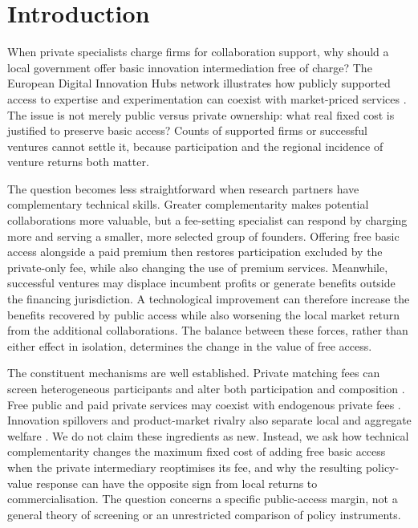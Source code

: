 \section{Introduction}\label{sec:intro}

When private specialists charge firms for collaboration support, why should a local government offer basic innovation intermediation free of charge? The European Digital Innovation Hubs network illustrates how publicly supported access to expertise and experimentation can coexist with market-priced services \citep{EuropeanCommissionEDIH,EDIHFAQ2026}. The issue is not merely public versus private ownership: what real fixed cost is justified to preserve basic access? Counts of supported firms or successful ventures cannot settle it, because participation and the regional incidence of venture returns both matter.

The question becomes less straightforward when research partners have complementary technical skills. Greater complementarity makes potential collaborations more valuable, but a fee-setting specialist can respond by charging more and serving a smaller, more selected group of founders. Offering free basic access alongside a paid premium then restores participation excluded by the private-only fee, while also changing the use of premium services. Meanwhile, successful ventures may displace incumbent profits or generate benefits outside the financing jurisdiction. A technological improvement can therefore increase the benefits recovered by public access while also worsening the local market return from the additional collaborations. The balance between these forces, rather than either effect in isolation, determines the change in the value of free access.

The constituent mechanisms are well established. Private matching fees can screen heterogeneous participants and alter both participation and composition \citep{DamianoLi2007,DamianoLi2008,Hagiu2004b}. Free public and paid private services may coexist with endogenous private fees \citep{HuaChenZhang2016,PeitzSato2026,LiuReshidiRivadeneyra2026}. Innovation spillovers and product-market rivalry also separate local and aggregate welfare \citep{DAspremontJacquemin1988,CremerMarchandPestieau1997}. We do not claim these ingredients as new. Instead, we ask how technical complementarity changes the maximum fixed cost of adding free basic access when the private intermediary reoptimises its fee, and why the resulting policy-value response can have the opposite sign from local returns to commercialisation. The question concerns a specific public-access margin, not a general theory of screening or an unrestricted comparison of policy instruments.

